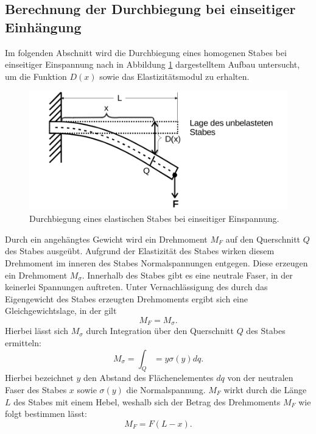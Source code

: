 \subsection{Berechnung der Durchbiegung bei einseitiger Einhängung}
\label{sec:einseitigg}
Im folgenden Abschnitt wird die Durchbiegung eines homogenen Stabes bei einseitiger
Einspannung nach in Abbildung \ref{fig:einseitig} dargestelltem Aufbau untersucht,
um die Funktion $D(x)$ sowie das Elastizitätsmodul zu erhalten.
\begin{figure}[H]
  \centering
  \includegraphics[scale=0.4]{content/EinspannungEinseitig.png}
  \caption{Durchbiegung eines elastischen Stabes bei einseitiger Einspannung.}
  \label{fig:einseitig}
\end{figure}
\noindent
Durch ein angehängtes Gewicht wird ein Drehmoment $M_F$ auf den Querschnitt $Q$ des
Stabes ausgeübt. Aufgrund der Elastizität des Stabes wirken diesem Drehmoment im
inneren des Stabes Normalspannungen entgegen. Diese erzeugen ein Drehmoment $M_\sigma$.
Innerhalb des Stabes gibt es eine neutrale Faser, in der keinerlei Spannungen auftreten.
Unter Vernachlässigung des durch das Eigengewicht des Stabes erzeugten Drehmoments
ergibt sich eine Gleichgewichtslage, in der gilt
\begin{equation}
  M_F = M_\sigma .
  \label{eqn:momentengleichung1}
\end{equation}
Hierbei lässt sich $M_\sigma$ durch Integration über den Querschnitt $Q$ des Stabes
ermitteln:
\begin{equation}
  M_\sigma = \int_Q = y \sigma(y) dq.
  \label{eqn:msigma}
\end{equation}
Hierbei bezeichnet $y$ den Abstand des Flächenelementes $dq$ von der neutralen Faser
des Stabes $x$ sowie $\sigma(y)$ die Normalspannung.
$M_F$ wirkt durch die Länge $L$ des Stabes mit einem Hebel, weshalb sich der Betrag des Drehmoments
$M_F$ wie folgt bestimmen lässt:
\begin{equation}
  M_F = F(L - x).
  \label{eqn:mf}
\end{equation}
